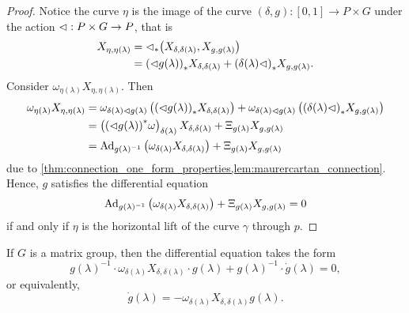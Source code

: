 \begin{proof}
    Notice the curve \(\eta\) is the image of the curve \((\delta, g) : [0,1] \to P \times G\) under the action \(\mathbin{\vartriangleleft} : P \times G \to P\), that is
    \begin{align*}
        X_{\eta, \eta(\lambda)} &= {\mathbin{\vartriangleleft}}_{\ast{}}{\left(X_{\delta,\delta(\lambda)}, X_{g, g(\lambda)}\right)}\\
                                &= {(\mathbin{\vartriangleleft} g(\lambda))}_{\ast{}}{X_{\delta,\delta(\lambda)}} + {(\delta(\lambda)\mathbin{\vartriangleleft})}_{\ast{}}{X_{g,g(\lambda)}}.
    \end{align*}
    Consider \(\omega_{\eta(\lambda)}X_{\eta,\eta(\lambda)}\). Then
    \begin{align*}
        \omega_{\eta(\lambda)}X_{\eta, \eta(\lambda)} &= \omega_{\delta(\lambda) \mathbin{\vartriangleleft} g(\lambda)}\left({(\mathbin{\vartriangleleft} g(\lambda))}_{\ast{}}{X_{\delta,\delta(\lambda)}}\right) + \omega_{\delta(\lambda) \mathbin{\vartriangleleft} g(\lambda)}\left({(\delta(\lambda)\mathbin{\vartriangleleft})}_{\ast{}}{X_{g,g(\lambda)}}\right)\\
                                                      &= \left({(\mathbin{\vartriangleleft} g(\lambda))}^{\ast}_{}\omega\right)_{\delta(\lambda)}X_{\delta,\delta(\lambda)} + \Xi_{g(\lambda)}X_{g,g(\lambda)}\\
                                                      &= \operatorname{Ad}_{g(\lambda)^{-1}}\left(\omega_{\delta(\lambda)}X_{\delta,\delta(\lambda)}\right)+ \Xi_{g(\lambda)}X_{g,g(\lambda)}
    \end{align*}
    due to \cref{thm:connection_one_form_properties,lem:maurercartan_connection}. Hence, \(g\) satisfies the differential equation
    \begin{equation*}
        \operatorname{Ad}_{g(\lambda)^{-1}}\left(\omega_{\delta(\lambda)}X_{\delta, \delta(\lambda)}\right) + \Xi_{g(\lambda)}X_{g, g(\lambda)} = 0
    \end{equation*}
    if and only if \(\eta\) is the horizontal lift of the curve \(\gamma\) through \(p\).
\end{proof}
\begin{corollary}
    If \(G\) is a matrix group, then the differential equation takes the form
    \begin{equation*}
        g(\lambda)^{-1} \cdot \omega_{\delta(\lambda)} X_{\delta,\delta(\lambda)} \cdot g(\lambda) + g(\lambda)^{-1} \cdot \dot{g}(\lambda) = 0,
    \end{equation*}
    or equivalently,
    \begin{equation*}
        \dot{g}(\lambda) = - \omega_{\delta(\lambda)}X_{\delta,\delta(\lambda)} g(\lambda).
    \end{equation*}
\end{corollary}

